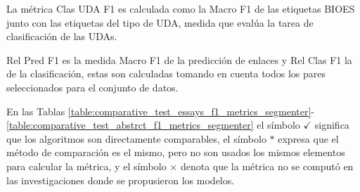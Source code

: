 \documentclass[a4paper,11pt,twocolumn,twoside]{article}
\begin{document}
La métrica Clas UDA F1 es 
calculada como la Macro F1 de las etiquetas BIOES junto con las etiquetas del tipo de 
UDA, medida que evalúa la tarea de clasificación de las UDAs. 

Rel Pred F1 es la medida 
Macro F1 de la predicción de enlaces y Rel Clas F1 la de la clasificación, estas 
son calculadas tomando en cuenta todos los pares seleccionados para el conjunto de 
datos. 

En las Tablas \ref{table:comparative_test_essays_f1_metrics_segmenter}-\ref{table:comparative_test_abstrct_f1_metrics_segmenter} el símbolo $\checkmark$ significa 
que los algoritmos son directamente comparables, el símbolo
$*$ expresa que el método de comparación es el mismo, pero no son usados los mismos 
elementos para calcular la métrica, y el símbolo $\times$ denota que la métrica no 
se computó en las investigaciones donde se propusieron los modelos.
\end{document}
